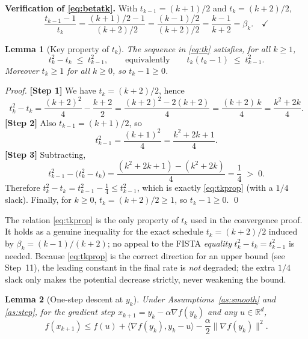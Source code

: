 \documentclass{article}
\newtheorem{lemma}{Lemma}
\begin{document}
\noindent\textbf{Verification of \eqref{eq:betatk}.}\quad
With $t_{k-1} = (k+1)/2$ and $t_k = (k+2)/2$,
\[
\frac{t_{k-1}-1}{t_k} = \frac{(k+1)/2 - 1}{(k+2)/2}
= \frac{(k-1)/2}{(k+2)/2} = \frac{k-1}{k+2} = \beta_k. \quad\checkmark
\]

\begin{lemma}[Key property of $t_k$]\label{lem:tk}
The sequence in \eqref{eq:tk} satisfies, for all $k \ge 1$,
\begin{equation}
t_k^2 - t_k \;\le\; t_{k-1}^2 ,
\qquad\text{equivalently}\qquad
t_k(t_k - 1) \;\le\; t_{k-1}^2 . \label{eq:tkprop}
\end{equation}
Moreover $t_k \ge 1$ for all $k \ge 0$, so $t_k - 1 \ge 0$.
\end{lemma}

\begin{proof}
\textbf{[Step 1]} We have $t_k = (k+2)/2$, hence
\[
t_k^2 - t_k = \frac{(k+2)^2}{4} - \frac{k+2}{2}
= \frac{(k+2)^2 - 2(k+2)}{4}
= \frac{(k+2)\,k}{4} = \frac{k^2 + 2k}{4}.
\]
\textbf{[Step 2]} Also $t_{k-1} = (k+1)/2$, so
\[
t_{k-1}^2 = \frac{(k+1)^2}{4} = \frac{k^2 + 2k + 1}{4}.
\]
\textbf{[Step 3]} Subtracting,
\[
t_{k-1}^2 - \big(t_k^2 - t_k\big)
= \frac{(k^2+2k+1) - (k^2+2k)}{4} = \frac{1}{4} \;>\; 0 .
\]
Therefore $t_k^2 - t_k = t_{k-1}^2 - \tfrac14 \le t_{k-1}^2$, which is exactly
\eqref{eq:tkprop} (with a $1/4$ slack). Finally, for $k \ge 0$,
$t_k = (k+2)/2 \ge 1$, so $t_k - 1 \ge 0$. \qed
\end{proof}

\begin{remark}
The relation \eqref{eq:tkprop} is the only property of $t_k$ used in the
convergence proof. It holds as a genuine inequality for the exact schedule
$t_k=(k+2)/2$ induced by $\beta_k=(k-1)/(k+2)$; no appeal to the FISTA
\emph{equality} $t_k^2-t_k=t_{k-1}^2$ is needed. Because \eqref{eq:tkprop} is the
correct direction for an upper bound (see Step~11), the leading constant in the
final rate is \emph{not} degraded; the extra $1/4$ slack only makes the
potential decrease strictly, never weakening the bound.
\end{remark}

\begin{lemma}[One-step descent at $y_k$]\label{lem:descent}
Under Assumptions~\ref{as:smooth} and \ref{as:step}, for the gradient step
$x_{k+1} = y_k - \alpha \nabla f(y_k)$ and any $u \in \mathbb{R}^d$,
\begin{equation}
f(x_{k+1}) \le f(u) + \langle \nabla f(y_k), y_k - u\rangle
- \frac{\alpha}{2}\|\nabla f(y_k)\|^2. \label{eq:onestep}
\end{equation}
\end{lemma}
\end{document}
